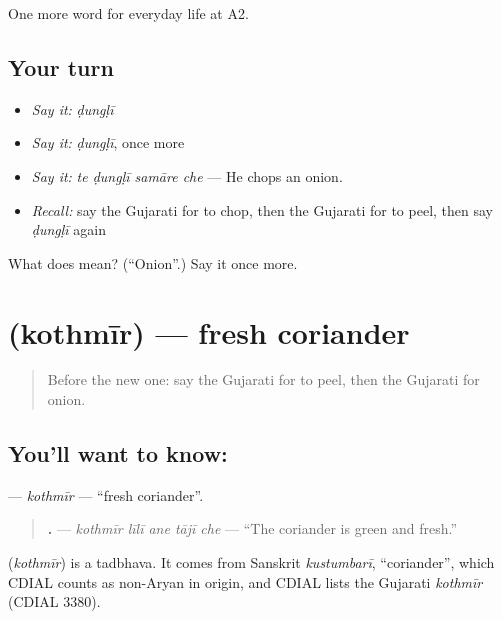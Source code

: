 \begin{grammarlens}[title={What you've built}]
One more word for everyday life at A2.
\end{grammarlens}

\subsection*{Your turn}
\begin{itemize}
\raggedright
  \item \emph{Say it:} \emph{ḍungḷī}
  \item \emph{Say it:} \emph{ḍungḷī}, once more
  \item \emph{Say it:} \emph{te ḍungḷī samāre che} — He chops an onion.
  \item \emph{Recall:} say the Gujarati for to chop, then the Gujarati for to peel, then say \emph{ḍungḷī} again
\end{itemize}

\begin{tcolorbox}[breakable,colback=teal!4,colframe=teal!35!black,title={Before you move on}]
What does  mean? (\textquotedblleft{}Onion\textquotedblright{}.) Say it once more.
\end{tcolorbox}
\section[\texorpdfstring{\gu{કોથમીર} (kothmīr)}{કોથમીર (kothmīr)}]{ (kothmīr) — fresh coriander}

\label{lesson:GU-C166-kothmir}



\begin{quote}
Before the new one: say the Gujarati for to peel, then the Gujarati for onion.
\end{quote}

\subsection*{You'll want to know: }
\textbf{} — \emph{kothmīr} — \textquotedblleft{}fresh coriander\textquotedblright{}.

\begin{quote}
\textbf{    .} — \emph{kothmīr līlī ane tājī che} — \textquotedblleft{}The coriander is green and fresh.\textquotedblright{}
\end{quote}

\begin{cousinweb}
\textbf{} (\emph{kothmīr}) is a tadbhava. It comes from Sanskrit \emph{kustumbarī}, \textquotedblleft{}coriander\textquotedblright{}, which CDIAL counts as non-Aryan in origin, and CDIAL lists the Gujarati \emph{kothmīr} (CDIAL 3380).
\end{cousinweb}


